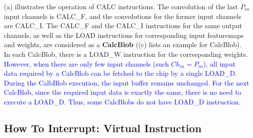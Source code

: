 (a) illustrates the operation of CALC instructions. The convolution of the last $ P_{in} $ input channels is CALC\_F, and the convolutions for the former input channels are CALC\_I. The CALC\_F and the CALC\_I instructions for the same output channels, as well as the LOAD instructions for corresponding input featuremaps and weights, are considered as a \textbf{CalcBlob} ((c) lists an example for CalcBlob). In each CalcBlob, there is a LOAD\_W instruction for the corresponding weights. 
\textcolor{blue}{
However, when there are only few input channels (such $Ch_{in} = P_{in}$), all input data required by a CalcBlob can be fetched to the chip by a single LOAD\_D. 
During the CalbBlob execution, the input buffer remains unchanged. 
For the next CalcBlob, since the required input data is exactly the same, there is no need to execute a LOAD\_D.
Thus, some CalcBlobs do not have LOAD\_D instruction.
}









\subsection{How To Interrupt: Virtual Instruction}
\label{sec:howinter}


